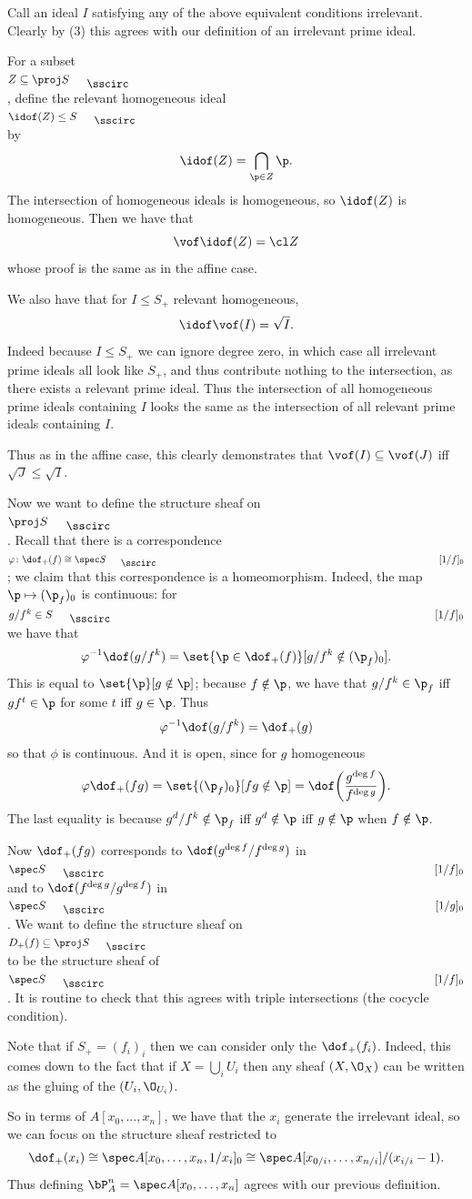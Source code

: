 Call an ideal $I$ satisfying any of the above equivalent conditions {\emphcolor irrelevant}.
Clearly by (3) this agrees with our definition of an irrelevant prime ideal.

For a subset $Z\subseteq\proj S_\bul$, define the relevant homogeneous ideal $\idof(Z)\leq S_\bul$ by
$$ \idof(Z) = \bigcap_{\p\in Z}\p . $$
The intersection of homogeneous ideals is homogeneous, so $\idof(Z)$ is homogeneous.
Then we have that
$$ \vof\idof(Z) = \cl Z $$
whose proof is the same as in the affine case.

We also have that for $I\leq S_+$ relevant homogeneous,
$$ \idof\vof(I) = \sqrt I . $$
Indeed because $I\leq S_+$ we can ignore degree zero, in which case all irrelevant prime ideals all look like $S_+$, and thus contribute
nothing to the intersection, as there exists a relevant prime ideal.
Thus the intersection of all homogeneous prime ideals containing $I$ looks the same as the intersection of all relevant prime ideals
containing $I$.

Thus as in the affine case, this clearly demonstrates that $\vof(I)\subseteq\vof(J)$ iff $\sqrt J\leq\sqrt I$.

Now we want to define the structure sheaf on $\proj S_\bul$.
Recall that there is a correspondence $\phi\colon\dof_+(f)\cong\spec S_\bul[1/f]_0$; we claim that this correspondence is a homeomorphism.
Indeed, the map $\p\mapsto(\p_f)_0$ is continuous: for $g/f^k\in S_\bul[1/f]_0$ we have that
$$ \phi^{-1}\dof(g/f^k) = \set{\p\in\dof_+(f)}[g/f^k\notin(\p_f)_0] . $$
This is equal to $\set{\p}[g\notin\p]$; because $f\notin\p$, we have that $g/f^k\in\p_f$ iff $gf^t\in\p$ for some $t$ iff $g\in\p$.
Thus
$$ \phi^{-1}\dof(g/f^k) = \dof_+(g) $$
so that $\phi$ is continuous.
And it is open, since for $g$ homogeneous
$$ \phi\dof_+(fg) = \set{(\p_f)_0}[fg\notin\p] = \dof\parens{\frac{g^{\deg f}}{f^{\deg g}}} . $$
The last equality is because $g^d/f^k\notin\p_f$ iff $g^d\notin\p$ iff $g\notin\p$ when $f\notin\p$.

Now $\dof_+(fg)$ corresponds to $\dof(g^{\deg f}/f^{\deg g})$ in $\spec S_\bul[1/f]_0$ and to $\dof(f^{\deg g}/g^{\deg f})$ in
$\spec S_\bul[1/g]_0$.
We want to define the structure sheaf on $D_+(f)\subseteq\proj S_\bul$ to be the structure sheaf of $\spec S_\bul[1/f]_0$.
It is routine to check that this agrees with triple intersections (the cocycle condition).

Note that if $S_+=(f_i)_i$ then we can consider only the $\dof_+(f_i)$.
Indeed, this comes down to the fact that if $X=\bigcup_iU_i$ then any sheaf $(X,\O_X)$ can be written as the gluing of the $(U_i,\O_{U_i})$.

So in terms of $A[x_0,\dots,x_n]$, we have that the $x_i$ generate the irrelevant ideal, so we can focus on the structure sheaf restricted to
$$ \dof_+(x_i) \cong \spec A[x_0,\dots,x_n,1/x_i]_0 \cong \spec A[x_{0/i},\dots,x_{n/i}]/(x_{i/i}-1) . $$
Thus defining $\bP^n_A=\spec A[x_0,\dots,x_n]$ agrees with our previous definition.

